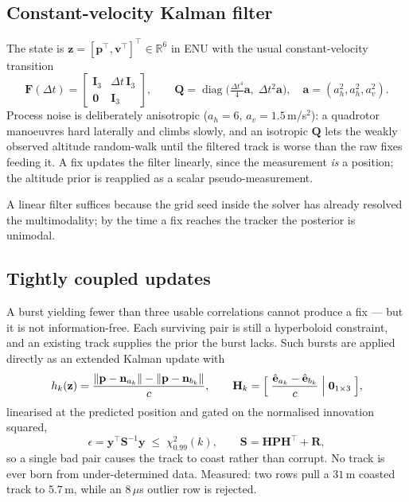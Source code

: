 \documentclass[11pt,a4paper]{article}
\newcommand{\uvec}[1]{\hat{\mathbf{#1}}}
\newcommand{\R}{\mathbb{R}}
\DeclareMathOperator{\diag}{diag}
\begin{document}
\subsection{Constant-velocity Kalman filter}

The state is $\mathbf{z}=[\mathbf{p}^\top,\mathbf{v}^\top]^\top\in\R^6$ in
ENU with the usual constant-velocity transition
\begin{equation}
  \mathbf{F}(\Delta t)=\begin{bmatrix}\mathbf{I}_3 & \Delta t\,\mathbf{I}_3\\
  \mathbf{0} & \mathbf{I}_3\end{bmatrix},\qquad
  \mathbf{Q}=\diag\bigl(\tfrac{\Delta t^{4}}{4}\boldsymbol{a},\;
  \Delta t^{2}\boldsymbol{a}\bigr),\quad
  \boldsymbol{a}=(a_h^2,a_h^2,a_v^2).
\end{equation}
Process noise is deliberately anisotropic ($a_h=6$, $a_v=1.5$\,m/s$^2$): a
quadrotor manoeuvres hard laterally and climbs slowly, and an isotropic
$\mathbf{Q}$ lets the weakly observed altitude random-walk until the
filtered track is worse than the raw fixes feeding it. A fix updates the
filter linearly, since the measurement \emph{is} a position; the altitude
prior is reapplied as a scalar pseudo-measurement.

A linear filter suffices because the grid seed inside the solver has already
resolved the multimodality; by the time a fix reaches the tracker the
posterior is unimodal.

\subsection{Tightly coupled updates}

A burst yielding fewer than three usable correlations cannot produce a fix
--- but it is not information-free. Each surviving pair is still a
hyperboloid constraint, and an existing track supplies the prior the burst
lacks. Such bursts are applied directly as an extended Kalman update with
\begin{equation}
  h_k(\mathbf{z}) = \frac{\lVert\mathbf{p}-\mathbf{n}_{a_k}\rVert
  -\lVert\mathbf{p}-\mathbf{n}_{b_k}\rVert}{c},
  \qquad
  \mathbf{H}_k = \Bigl[\;\frac{\uvec{e}_{a_k}-\uvec{e}_{b_k}}{c}\;\Big|\;
  \mathbf{0}_{1\times3}\;\Bigr],
\end{equation}
linearised at the predicted position and gated on the normalised innovation
squared,
\begin{equation}
  \epsilon = \mathbf{y}^\top\mathbf{S}^{-1}\mathbf{y}
  \;\le\; \chi^{2}_{0.99}(k),
  \qquad \mathbf{S}=\mathbf{H}\mathbf{P}\mathbf{H}^\top+\mathbf{R},
\end{equation}
so a single bad pair causes the track to coast rather than corrupt. No track
is ever born from under-determined data. Measured: two rows pull a $31$\,m
coasted track to $5.7$\,m, while an $8\,\mu$s outlier row is rejected.
\end{document}

